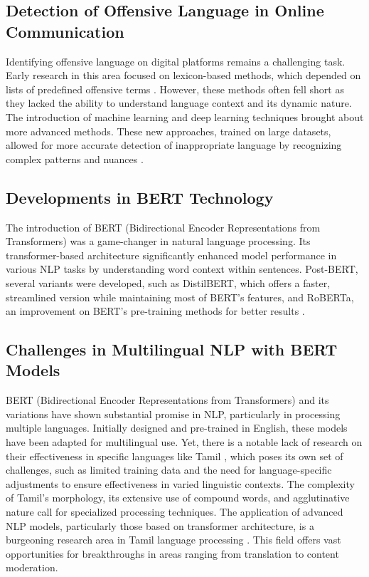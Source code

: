 \documentclass{svproc}
\begin{document}
\subsection{Detection of Offensive Language in Online Communication}

Identifying offensive language on digital platforms remains a challenging task. Early research in this area focused on lexicon-based methods, which depended on lists of predefined offensive terms \cite{barman2023hate}. However, these methods often fell short as they lacked the ability to understand language context and its dynamic nature. The introduction of machine learning and deep learning techniques brought about more advanced methods. These new approaches, trained on large datasets, allowed for more accurate detection of inappropriate language by recognizing complex patterns and nuances \cite{saleh2023detection}.

\subsection{Developments in BERT Technology}

The introduction of BERT (Bidirectional Encoder Representations from Transformers) was a game-changer in natural language processing. Its transformer-based architecture significantly enhanced model performance in various NLP tasks by understanding word context within sentences. Post-BERT, several variants were developed, such as DistilBERT, which offers a faster, streamlined version while maintaining most of BERT's features, and RoBERTa, an improvement on BERT's pre-training methods for better results \cite{mazari2023bert}.

\subsection{Challenges in Multilingual NLP with BERT Models}

BERT (Bidirectional Encoder Representations from Transformers) and its variations have shown substantial promise in NLP, particularly in processing multiple languages. Initially designed and pre-trained in English, these models have been adapted for multilingual use\cite{jothi2024}. Yet, there is a notable lack of research on their effectiveness in specific languages like Tamil \cite{shanmugavadivel2023kec_ai_nlp}, which poses its own set of challenges, such as limited training data and the need for language-specific adjustments to ensure effectiveness in varied linguistic contexts.
The complexity of Tamil's morphology, its extensive use of compound words, and agglutinative nature call for specialized processing techniques. The application of advanced NLP models, particularly those based on transformer architecture, is a burgeoning research area in Tamil language processing \cite{khan2023offensive, priyadharshini2023overview}. This field offers vast opportunities for breakthroughs in areas ranging from translation to content moderation.
\end{document}
